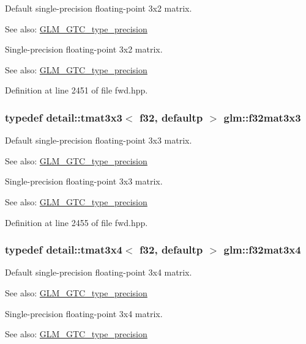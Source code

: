 Default single-precision floating-point 3x2 matrix. \begin{Desc}
\item[See also:]\hyperlink{group__gtc__type__precision}{GLM\_\-GTC\_\-type\_\-precision}\end{Desc}
Single-precision floating-point 3x2 matrix. \begin{Desc}
\item[See also:]\hyperlink{group__gtc__type__precision}{GLM\_\-GTC\_\-type\_\-precision} \end{Desc}


Definition at line 2451 of file fwd.hpp.\hypertarget{group__gtc__type__precision_g56465dc40dd0e35221f00bdf44fb7c2e}{
\subsubsection[f32mat3x3]{\setlength{\rightskip}{0pt plus 5cm}typedef detail::tmat3x3$<$ f32, defaultp $>$ {\bf glm::f32mat3x3}}}
\label{group__gtc__type__precision_g56465dc40dd0e35221f00bdf44fb7c2e}


Default single-precision floating-point 3x3 matrix. \begin{Desc}
\item[See also:]\hyperlink{group__gtc__type__precision}{GLM\_\-GTC\_\-type\_\-precision}\end{Desc}
Single-precision floating-point 3x3 matrix. \begin{Desc}
\item[See also:]\hyperlink{group__gtc__type__precision}{GLM\_\-GTC\_\-type\_\-precision} \end{Desc}


Definition at line 2455 of file fwd.hpp.\hypertarget{group__gtc__type__precision_g9d953c44b7bf260d2f2e61d73dc2ab08}{
\subsubsection[f32mat3x4]{\setlength{\rightskip}{0pt plus 5cm}typedef detail::tmat3x4$<$ f32, defaultp $>$ {\bf glm::f32mat3x4}}}
\label{group__gtc__type__precision_g9d953c44b7bf260d2f2e61d73dc2ab08}


Default single-precision floating-point 3x4 matrix. \begin{Desc}
\item[See also:]\hyperlink{group__gtc__type__precision}{GLM\_\-GTC\_\-type\_\-precision}\end{Desc}
Single-precision floating-point 3x4 matrix. \begin{Desc}
\item[See also:]\hyperlink{group__gtc__type__precision}{GLM\_\-GTC\_\-type\_\-precision} \end{Desc}


